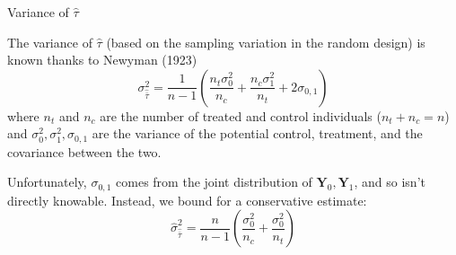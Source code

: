 \documentclass[notes,11pt, aspectratio=169]{beamer}
\newenvironment{wideitemize}{\itemize\addtolength{\itemsep}{10pt}}{\enditemize}
\begin{document}
\begin{frame}{Variance of $\hat{\tau}$}
  \begin{wideitemize}
  \item The variance of $\hat{\tau}$ (based on the sampling variation
    in the random design) is known thanks to Newyman (1923)
    \begin{equation}
      \sigma^{2}_{\hat{\bar{\tau}}} = \frac{1}{n-1}\left(\frac{n_{t}\sigma^{2}_{0}}{n_{c}} + \frac{n_{c} \sigma^{2}_{1}}{n_{t}} + 2\sigma_{0,1}\right)
    \end{equation}
    where $n_{t}$ and $n_{c}$ are the number of treated and control
    individuals ($n_{t} + n_{c} = n$) and
    $\sigma^{2}_{0}, \sigma^{2}_{1}, \sigma_{0,1}$ are the variance of
    the potential control, treatment, and the covariance between the
    two.
  \item Unfortunately, $\sigma_{0,1}$ comes from the joint
    distribution of $\mathbf{Y}_{0}, \mathbf{Y}_{1}$, and so isn't directly knowable. Instead, we bound for a
    conservative estimate:
    \begin{equation}
      \hat{\sigma}^{2}_{\hat{\bar{\tau}}} = \frac{n}{n-1}\left(\frac{\sigma^{2}_{0}}{n_{c}} + \frac{\sigma^{2}_{0}}{n_{t}}\right)
    \end{equation}
  \end{wideitemize}
\end{frame}
\end{document}
